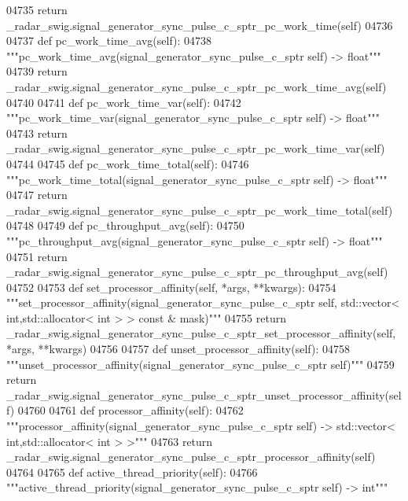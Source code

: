 \begin{DoxyCode}
{{{{{{{{{{{{{{{{04735         \textcolor{keywordflow}{return} \_radar\_swig.signal\_generator\_sync\_pulse\_c\_sptr\_pc\_work\_time(self)
04736 
04737     \textcolor{keyword}{def }pc_work_time_avg(self):
04738         \textcolor{stringliteral}{"""pc\_work\_time\_avg(signal\_generator\_sync\_pulse\_c\_sptr self) -> float"""}
04739         \textcolor{keywordflow}{return} \_radar\_swig.signal\_generator\_sync\_pulse\_c\_sptr\_pc\_work\_time\_avg(self)
04740 
04741     \textcolor{keyword}{def }pc_work_time_var(self):
04742         \textcolor{stringliteral}{"""pc\_work\_time\_var(signal\_generator\_sync\_pulse\_c\_sptr self) -> float"""}
04743         \textcolor{keywordflow}{return} \_radar\_swig.signal\_generator\_sync\_pulse\_c\_sptr\_pc\_work\_time\_var(self)
04744 
04745     \textcolor{keyword}{def }pc_work_time_total(self):
04746         \textcolor{stringliteral}{"""pc\_work\_time\_total(signal\_generator\_sync\_pulse\_c\_sptr self) -> float"""}
04747         \textcolor{keywordflow}{return} \_radar\_swig.signal\_generator\_sync\_pulse\_c\_sptr\_pc\_work\_time\_total(self)
04748 
04749     \textcolor{keyword}{def }pc_throughput_avg(self):
04750         \textcolor{stringliteral}{"""pc\_throughput\_avg(signal\_generator\_sync\_pulse\_c\_sptr self) -> float"""}
04751         \textcolor{keywordflow}{return} \_radar\_swig.signal\_generator\_sync\_pulse\_c\_sptr\_pc\_throughput\_avg(self)
04752 
04753     \textcolor{keyword}{def }set_processor_affinity(self, *args, **kwargs):
04754         \textcolor{stringliteral}{"""set\_processor\_affinity(signal\_generator\_sync\_pulse\_c\_sptr self, std::vector< int,std::allocator<
       int > > const & mask)"""}
04755         \textcolor{keywordflow}{return} \_radar\_swig.signal\_generator\_sync\_pulse\_c\_sptr\_set\_processor\_affinity(self, *args, **kwargs)
04756 
04757     \textcolor{keyword}{def }unset_processor_affinity(self):
04758         \textcolor{stringliteral}{"""unset\_processor\_affinity(signal\_generator\_sync\_pulse\_c\_sptr self)"""}
04759         \textcolor{keywordflow}{return} \_radar\_swig.signal\_generator\_sync\_pulse\_c\_sptr\_unset\_processor\_affinity(self)
04760 
04761     \textcolor{keyword}{def }processor_affinity(self):
04762         \textcolor{stringliteral}{"""processor\_affinity(signal\_generator\_sync\_pulse\_c\_sptr self) -> std::vector< int,std::allocator<
       int > >"""}
04763         \textcolor{keywordflow}{return} \_radar\_swig.signal\_generator\_sync\_pulse\_c\_sptr\_processor\_affinity(self)
04764 
04765     \textcolor{keyword}{def }active_thread_priority(self):
04766         \textcolor{stringliteral}{"""active\_thread\_priority(signal\_generator\_sync\_pulse\_c\_sptr self) -> int"""}
}}}}}}}}}}}}}}}}
\end{DoxyCode}

